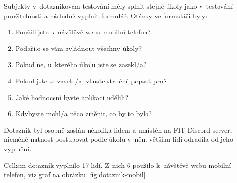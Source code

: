 \par Subjekty v~dotazníkovém testování měly splnit stejné úkoly jako v~testování použitelnosti a následně vyplnit formulář. Otázky ve formuláři byly:
\begin{enumerate}
    \item Použili jste k~návštěvě webu mobilní telefon?
    \item Podařilo se vám zvládnout všechny úkoly?
    \item Pokud ne, u~kterého úkolu jste se zasekl/a?
    \item Pokud jste se zasekl/a, zkuste stručně popsat proč.
    \item Jaké hodnocení byste aplikaci udělili?
    \item Kdybyste mohl/a něco změnit, co by to bylo?
\end{enumerate}

Dotazník byl osobně zaslán několika lidem a umístěn na FIT Discord server, nicméně nutnost postupovat podle úkolů v~něm většinu lidí odradila od jeho vyplnění. \\

\par Celkem dotazník vyplnilo 17 lidí. Z~nich 6 použilo k~návštěvě webu mobilní telefon, viz graf na obrázku \ref{fig:dotaznik-mobil}. 


